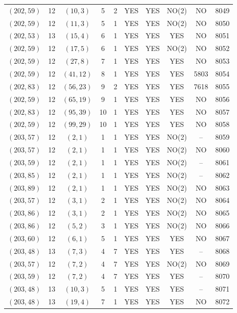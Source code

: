 \begin{longtable}{|c|c|c|c|c|c|c|c|c|c|}
$(202, 59)$ & 12 & $(10, 3)$ & 5 & 2 & YES & YES & NO(2) & NO & 8049\\
$(202, 59)$ & 12 & $(11, 3)$ & 5 & 1 & YES & YES & NO(2) & NO & 8050\\
$(202, 53)$ & 13 & $(15, 4)$ & 6 & 1 & YES & YES & YES & NO & 8051\\
$(202, 59)$ & 12 & $(17, 5)$ & 6 & 1 & YES & YES & NO(2) & NO & 8052\\
$(202, 59)$ & 12 & $(27, 8)$ & 7 & 1 & YES & YES & YES & NO & 8053\\
$(202, 59)$ & 12 & $(41, 12)$ & 8 & 1 & YES & YES & YES & 5803 & 8054\\
$(202, 83)$ & 12 & $(56, 23)$ & 9 & 2 & YES & YES & YES & 7618 & 8055\\
$(202, 59)$ & 12 & $(65, 19)$ & 9 & 1 & YES & YES & YES & NO & 8056\\
$(202, 83)$ & 12 & $(95, 39)$ & 10 & 1 & YES & YES & YES & NO & 8057\\
$(202, 59)$ & 12 & $(99, 29)$ & 10 & 1 & YES & YES & YES & NO & 8058\\
$(203, 57)$ & 12 & $(2, 1)$ & 1 & 1 & YES & YES & NO(2) & -- & 8059\\
$(203, 57)$ & 12 & $(2, 1)$ & 1 & 1 & YES & YES & NO(2) & NO & 8060\\
$(203, 59)$ & 12 & $(2, 1)$ & 1 & 1 & YES & YES & NO(2) & -- & 8061\\
$(203, 85)$ & 12 & $(2, 1)$ & 1 & 1 & YES & YES & NO(2) & -- & 8062\\
$(203, 89)$ & 12 & $(2, 1)$ & 1 & 1 & YES & YES & NO(2) & NO & 8063\\
$(203, 57)$ & 12 & $(3, 1)$ & 2 & 1 & YES & YES & NO(2) & NO & 8064\\
$(203, 86)$ & 12 & $(3, 1)$ & 2 & 1 & YES & YES & NO(2) & NO & 8065\\
$(203, 86)$ & 12 & $(5, 2)$ & 3 & 1 & YES & YES & NO(2) & NO & 8066\\
$(203, 60)$ & 12 & $(6, 1)$ & 5 & 1 & YES & YES & YES & NO & 8067\\
$(203, 48)$ & 13 & $(7, 3)$ & 4 & 7 & YES & YES & YES & -- & 8068\\
$(203, 57)$ & 12 & $(7, 2)$ & 4 & 7 & YES & YES & NO(2) & NO & 8069\\
$(203, 59)$ & 12 & $(7, 2)$ & 4 & 7 & YES & YES & YES & -- & 8070\\
$(203, 48)$ & 13 & $(10, 3)$ & 5 & 1 & YES & YES & YES & -- & 8071\\
$(203, 48)$ & 13 & $(19, 4)$ & 7 & 1 & YES & YES & YES & NO & 8072\\

\end{longtable}
